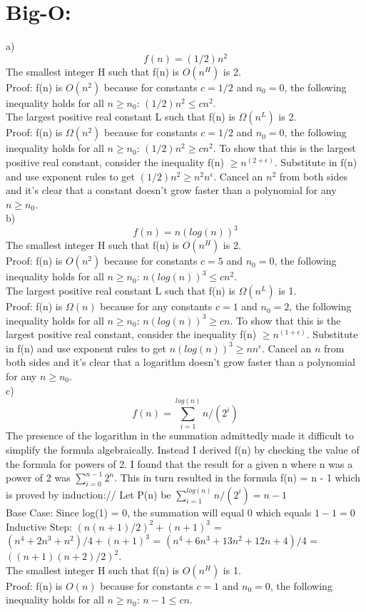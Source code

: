 \documentclass{article}
\begin{document}
\section{Big-O:}
a) \[f(n) = (1/2)n^2\] The smallest integer H such that f(n) is $O(n^H)$ is 2.\\ Proof: f(n) is $O(n^2)$ because for constants $c = 1/2$ and $n_0 = 0$, the following inequality holds for all $n \geq n_0$: $(1/2)n^2 \leq cn^2$.\\

The largest positive real constant L such that f(n) is $\Omega(n^L)$ is 2.\\ Proof: f(n) is $\Omega(n^2)$ because for constants $c = 1/2$ and $n_0 = 0$, the following inequality holds for all $n \geq n_0$: $(1/2)n^2 \geq cn^2$. To show that this is the largest positive real constant, consider the inequality f(n) $\geq n^{(2 + \epsilon)}$. Substitute in f(n) and use exponent rules to get $(1/2)n^2 \geq n^2n^{\epsilon}$. Cancel an $n^2$ from both sides and it's clear that a constant doesn't grow faster than a polynomial for any $n \geq n_0$.\\

b) \[f(n) = n(log(n))^3\] The smallest integer H such that f(n) is $O(n^H)$ is 2.\\ Proof: f(n) is $O(n^2)$ because for constants $c = 5$ and $n_0 = 0$, the following inequality holds for all $n \geq n_0$: $n(log(n))^3 \leq cn^2$.\\

The largest positive real constant L such that f(n) is $\Omega(n^L)$ is 1.\\ Proof: f(n) is $\Omega(n)$ because for any constants $c = 1$ and $n_0 = 2$, the following inequality holds for all $n \geq n_0$: $n(log(n))^3 \geq cn$. To show that this is the largest positive real constant, consider the inequality f(n) $\geq n^{(1 + \epsilon)}$. Substitute in f(n) and use exponent rules to get $n(log(n))^3 \geq nn^{\epsilon}$. Cancel an $n$ from both sides and it's clear that a logarithm doesn't grow faster than a polynomial for any $n \geq n_0$.\\

c) \[f(n) = \sum_{i=1}^{log(n)} n/(2^i)\] The presence of the logarithm in the summation admittedly made it difficult to simplify the formula algebraically. Instead I derived f(n) by checking the value of the formula for powers of 2. I found that the result for a given n where n was a power of 2 was $\sum_{i=0}^{n - 1} 2^n$. This in turn resulted in the formula f(n) = n - 1 which is proved by induction://
Let P(n) be $\sum_{i=1}^{log(n)} n/(2^i) = n - 1$\\
Base Case: Since log(1) = 0, the summation will equal 0 which equals $1 - 1 = 0$\\
Inductive Step: $(n(n + 1)/2)^2 + (n + 1)^3$ = $(n^4+2n^3+n^2)/4 + (n + 1)^3$ = $(n^4+6n^3+13n^2+12n+4)/4$ = $((n+1)(n+2)/2)^2$.\\
The smallest integer H such that f(n) is $O(n^H)$ is 1.\\ Proof: f(n) is $O(n)$ because for constants $c = 1$ and $n_0 = 0$, the following inequality holds for all $n \geq n_0$: $n - 1 \leq cn$.\\
\end{document}
